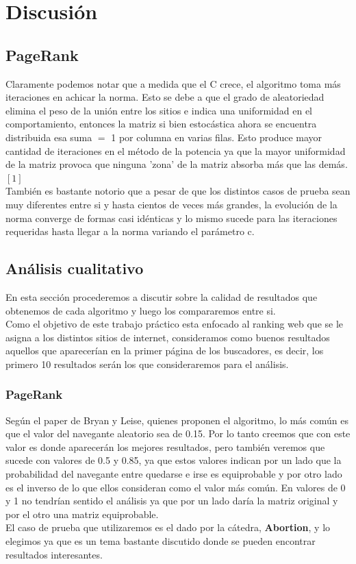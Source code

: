 \section{Discusi\'on}

\subsection{PageRank}
Claramente podemos notar que a medida que el C crece, el algoritmo toma más iteraciones en achicar la norma. Esto se debe a que el grado de aleatoriedad elimina el peso de la unión entre los sitios e indica una uniformidad en el comportamiento, entonces la matriz si bien estocástica ahora se encuentra distribuida esa suma $=$ 1 por columna en varias filas. Esto produce mayor cantidad de iteraciones en el método de la potencia ya que la mayor uniformidad de la matriz provoca que ninguna 'zona' de la matriz absorba más que las demás.   $[1]$\\
También es bastante notorio que a pesar de que los distintos casos de prueba sean muy diferentes entre si y hasta cientos de veces más grandes, la evolución de la norma converge de formas casi idénticas y lo mismo sucede para las iteraciones requeridas hasta llegar a la norma variando el parámetro c.

\subsection{Análisis cualitativo}

En esta sección procederemos a discutir sobre la calidad de resultados que obtenemos de cada algoritmo y luego los compararemos entre si.\\
Como el objetivo de este trabajo práctico esta enfocado al ranking web que se le asigna a los distintos sitios de internet, consideramos como buenos resultados aquellos que aparecerían en la primer página de los buscadores, es decir, los primero 10 resultados serán los que consideraremos para el análisis.

\subsubsection{PageRank}
Según el paper de Bryan y Leise, quienes proponen el algoritmo, lo más común es que el valor del navegante aleatorio sea de 0.15. Por lo tanto creemos que con este valor es donde aparecerán los mejores resultados, pero también veremos que sucede con valores de 0.5 y 0.85, ya que estos valores indican por un lado que la probabilidad del navegante entre quedarse e irse es equiprobable y por otro lado es el inverso de lo que ellos consideran como el valor más común. En valores de 0 y 1 no tendrían sentido el análisis ya que por un lado daría la matriz original y por el otro una matriz equiprobable.\\
El caso de prueba que utilizaremos es el dado por la cátedra, \textbf{Abortion}, y lo elegimos ya que es un tema bastante discutido donde se pueden encontrar resultados interesantes.
